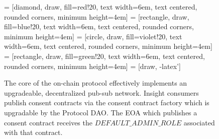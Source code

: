 \begin{figure}[ht] 
    \centering
     = [diamond, draw, fill=red!20, 
    text width=6em, text centered, rounded corners, minimum height=4em] 
     = [rectangle, draw, fill=blue!20, 
    text width=6em, text centered, rounded corners, minimum height=4em]
     = [circle, draw, fill=violet!20, 
        text width=6em, text centered, rounded corners, minimum height=4em]
     = [rectangle, draw, fill=green!20, 
        text width=6em, text centered, rounded corners, minimum height=4em]
     = [draw, -latex']
    
    \caption{The core of the on-chain protocol effectively implements an upgradeable, decentralized pub-sub 
    network. Insight consumers publish consent contracts via the consent contract factory which is 
    upgradable by the Protocol DAO. The EOA which publishes a consent contract receives the 
    $DEFAULT\_ADMIN\_ROLE$ associated with that contract.}
    \label{fig:ConsentFactory}
  \end{figure}